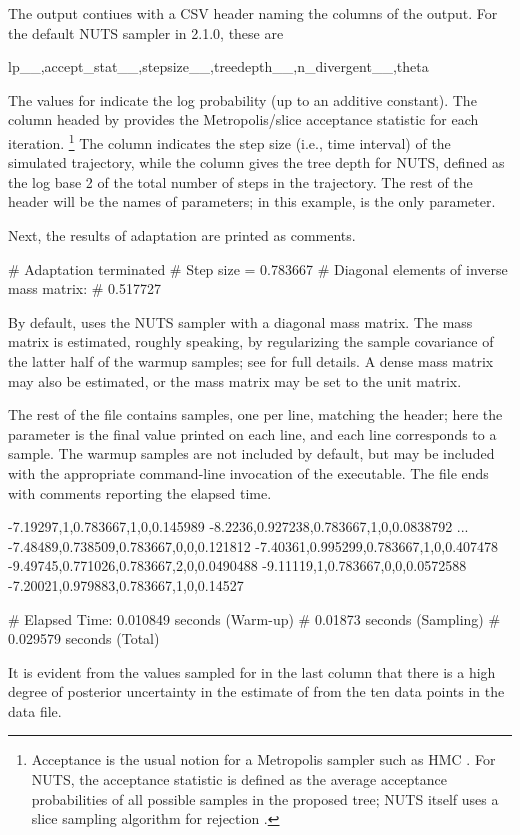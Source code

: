 \documentclass[article]{jss}
\begin{document}
The output contiues with a CSV header naming the columns of the
output. For the default NUTS sampler in  2.1.0, these are
%
\begin{Code}
lp__,accept_stat__,stepsize__,treedepth__,n_divergent__,theta
\end{Code}
%
The values for  indicate the log probability (up to an
additive constant).  The column headed by 
provides the Metropolis/slice acceptance statistic for each
iteration.%
%
\footnote{Acceptance is the usual notion for a Metropolis sampler such
  as HMC \citep{MetropolisEtAl:1953}.  For NUTS, the acceptance
  statistic is defined as the average acceptance probabilities of all
  possible samples in the proposed tree; NUTS itself uses a slice
  sampling algorithm for rejection \citep{Neal:2003, HoffmanGelman:2011}.}
%
The column  indicates the step size
(i.e., time interval) of the simulated trajectory, while the column 
 gives the tree depth for NUTS, defined as the 
log base 2 of the total number of steps in the trajectory.
The rest of the header will be the names of parameters; in this
example,  is the only parameter.

Next, the results of adaptation are printed as comments.
%
\begin{Code}
# Adaptation terminated
# Step size = 0.783667
# Diagonal elements of inverse mass matrix:
# 0.517727
\end{Code}
%
By default,  uses the NUTS sampler with a diagonal mass
matrix.  The mass matrix is estimated, roughly speaking, by
regularizing the sample covariance of the latter half of the warmup
samples; see \citep{Stan:2013} for full details.  A dense mass matrix
may also be estimated, or the mass matrix may be set to the unit matrix.

The rest of the file contains samples, one per line, matching the
header; here the parameter  is the final value printed on
each line, and each line corresponds to a sample.  The warmup samples
are not included by default, but may be included with the appropriate
command-line invocation of the executable. The file ends with comments reporting the elapsed time.
%
\begin{Code}
-7.19297,1,0.783667,1,0,0.145989
-8.2236,0.927238,0.783667,1,0,0.0838792
...
-7.48489,0.738509,0.783667,0,0,0.121812
-7.40361,0.995299,0.783667,1,0,0.407478
-9.49745,0.771026,0.783667,2,0,0.0490488
-9.11119,1,0.783667,0,0,0.0572588
-7.20021,0.979883,0.783667,1,0,0.14527

#  Elapsed Time: 0.010849 seconds (Warm-up)
#                0.01873 seconds (Sampling)
#                0.029579 seconds (Total)
\end{Code}
%
It is evident from the values sampled for  in the last
column that there is a high degree of posterior uncertainty in the
estimate of  from the ten data points in the data file.
\end{document}
